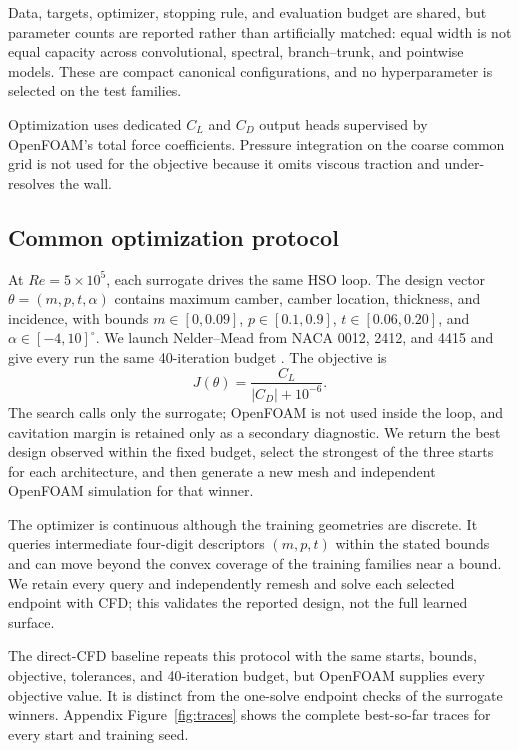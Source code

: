 \documentclass{article}
\begin{document}
Data, targets, optimizer, stopping rule, and evaluation budget are shared, but
parameter counts are reported rather than artificially matched: equal width is
not equal capacity across convolutional, spectral, branch--trunk, and pointwise
models. These are compact canonical configurations, and no hyperparameter is
selected on the test families.

Optimization uses dedicated $C_L$ and $C_D$ output heads supervised by
OpenFOAM's total force coefficients. Pressure integration on the coarse common
grid is not used for the objective because it omits viscous traction and
under-resolves the wall.

\subsection{Common optimization protocol}
At $Re=5\times10^5$, each surrogate drives the same HSO loop. The design
vector $\theta=(m,p,t,\alpha)$ contains maximum camber, camber location,
thickness, and incidence, with bounds $m\in[0,0.09]$, $p\in[0.1,0.9]$,
$t\in[0.06,0.20]$, and $\alpha\in[-4,10]^{\circ}$. We launch Nelder--Mead
from NACA 0012, 2412, and 4415 and give every run the same 40-iteration budget
\citep{nelder1965simplex}. The objective is
\begin{equation}
J(\theta)=\frac{C_L}{|C_D|+10^{-6}}.
\end{equation}
The search calls only the surrogate; OpenFOAM is not used inside the loop, and
cavitation margin is retained only as a secondary diagnostic. We return the
best design observed within the
fixed budget, select the strongest of the three starts for each architecture,
and then generate a new mesh and independent OpenFOAM simulation for that
winner.

The optimizer is continuous although the training geometries are discrete. It
queries intermediate four-digit descriptors $(m,p,t)$ within the stated bounds
and can move beyond the convex coverage of the training families near a bound.
We retain every query and independently remesh and solve each selected endpoint
with CFD; this validates the reported design, not the full learned surface.

The direct-CFD baseline repeats this protocol with the same starts, bounds,
objective, tolerances, and 40-iteration budget, but OpenFOAM supplies every
objective value. It is distinct from the one-solve endpoint checks of the
surrogate winners. Appendix Figure~\ref{fig:traces} shows the complete
best-so-far traces for every start and training seed.
\end{document}
